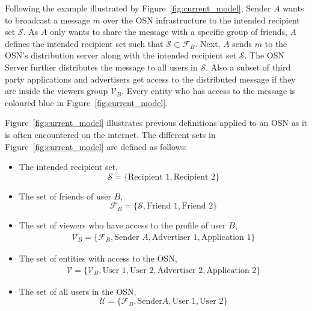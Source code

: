 Following the example illustrated by Figure~\ref{fig:current_model}, Sender $A$ wants to broadcast a message $m$ over the OSN infrastructure to the intended recipient set $\mathcal{S}$. As $A$ only wants to share the message with a specific group of friends, $A$ defines the intended recipient set such that $\mathcal{S} \subset \mathcal{F}_B$. Next, $A$ sends $m$ to the OSN's distribution server along with the intended recipient set $\mathcal{S}$. The OSN Server further distributes the message to all users in $\mathcal{S}$. Also a subset of third party applications and advertisers get access to the distributed message if they are inside the viewers group $\mathcal{V}_B$. Every entity who has access to the message is coloured blue in Figure~\ref{fig:current_model}.

Figure~\ref{fig:current_model} illustrates previous definitions applied to an OSN as it is often encountered on the internet. The different sets in Figure~\ref{fig:current_model} are defined as follows:
\begin{itemize}
 \item The intended recipient set,
 \begin{equation*}
  \mathcal{S} = \{ \textrm{Recipient 1}, \textrm{Recipient 2} \}
 \end{equation*}
 \item The set of friends of user $B$,
 \begin{equation*}
  \mathcal{F}_B = \{ \mathcal{S}, \textrm{Friend 1}, \textrm{Friend 2} \}
 \end{equation*}
 \item The set of viewers who have access to the profile of user $B$,
 \begin{equation*}
  \begin{split}
   \mathcal{V}_B = \{ \mathcal{F}_B, \textrm{Sender } A, \textrm{Advertiser 1}, \textrm{Application 1} \}
  \end{split}
 \end{equation*}
 \item The set of entities with access to the OSN,
\begin{equation*}
\begin{split}
 \mathcal{V} = \{ \mathcal{V}_B, \textrm{User 1}, \textrm{User 2}, \textrm{Advertiser 2}, \textrm{Application 2} \}
\end{split}
\end{equation*}
\item The set of all users in the OSN,
\begin{equation*}
 \mathcal{U} = \{ \mathcal{F}_B, \textrm{Sender} A, \textrm{User 1}, \textrm{User 2}\}
\end{equation*}
\end{itemize}


